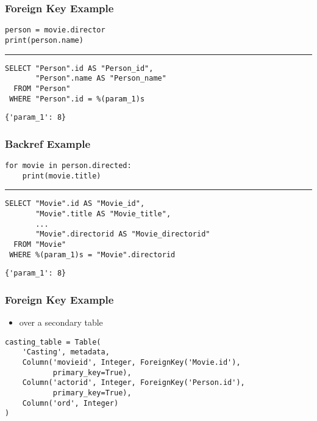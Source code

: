\documentclass[dvipsnames]{beamer}
\theoremstyle{plain}
\begin{document}
\begin{frame}[fragile]
  \frametitle{Foreign Key Example}

  \begin{lstlisting}
person = movie.director
print(person.name)
  \end{lstlisting}
  \hrule

  \begin{lstlisting}[language=FullSQL]
SELECT "Person".id AS "Person_id",
       "Person".name AS "Person_name"
  FROM "Person"
 WHERE "Person".id = %(param_1)s
  \end{lstlisting}

  \begin{lstlisting}
{'param_1': 8}
  \end{lstlisting}
\end{frame}

\begin{frame}[fragile]
  \frametitle{Backref Example}

  \begin{lstlisting}
for movie in person.directed:
    print(movie.title)
  \end{lstlisting}
  \hrule

  \begin{lstlisting}[language=FullSQL]
SELECT "Movie".id AS "Movie_id",
       "Movie".title AS "Movie_title",
       ...
       "Movie".directorid AS "Movie_directorid"
  FROM "Movie"
 WHERE %(param_1)s = "Movie".directorid
  \end{lstlisting}

  \begin{lstlisting}
{'param_1': 8}
  \end{lstlisting}
\end{frame}

\begin{frame}[fragile]
  \frametitle{Foreign Key Example}

  \begin{itemize}
    \item over a secondary table
  \end{itemize}

  \begin{lstlisting}
casting_table = Table(
    'Casting', metadata,
    Column('movieid', Integer, ForeignKey('Movie.id'),
           primary_key=True),
    Column('actorid', Integer, ForeignKey('Person.id'),
           primary_key=True),
    Column('ord', Integer)
)
  \end{lstlisting}
\end{frame}
\end{document}
